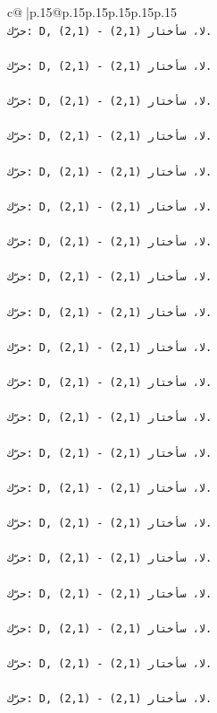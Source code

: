 \documentclass{article}
\begin{document}
{\begin{supertabular}{c@{$\;$}|p{.15\linewidth}@{}p{.15\linewidth}p{.15\linewidth}p{.15\linewidth}p{.15\linewidth}p{.15\linewidth}}
{{{\\ 
\texttt{حرّك: D, (2,1) {-} لا، سأختار (2,1).} \\
\\ 
\texttt{حرّك: D, (2,1) {-} لا، سأختار (2,1).} \\
\\ 
\texttt{حرّك: D, (2,1) {-} لا، سأختار (2,1).} \\
\\ 
\texttt{حرّك: D, (2,1) {-} لا، سأختار (2,1).} \\
\\ 
\texttt{حرّك: D, (2,1) {-} لا، سأختار (2,1).} \\
\\ 
\texttt{حرّك: D, (2,1) {-} لا، سأختار (2,1).} \\
\\ 
\texttt{حرّك: D, (2,1) {-} لا، سأختار (2,1).} \\
\\ 
\texttt{حرّك: D, (2,1) {-} لا، سأختار (2,1).} \\
\\ 
\texttt{حرّك: D, (2,1) {-} لا، سأختار (2,1).} \\
\\ 
\texttt{حرّك: D, (2,1) {-} لا، سأختار (2,1).} \\
\\ 
\texttt{حرّك: D, (2,1) {-} لا، سأختار (2,1).} \\
\\ 
\texttt{حرّك: D, (2,1) {-} لا، سأختار (2,1).} \\
\\ 
\texttt{حرّك: D, (2,1) {-} لا، سأختار (2,1).} \\
\\ 
\texttt{حرّك: D, (2,1) {-} لا، سأختار (2,1).} \\
\\ 
\texttt{حرّك: D, (2,1) {-} لا، سأختار (2,1).} \\
\\ 
\texttt{حرّك: D, (2,1) {-} لا، سأختار (2,1).} \\
\\ 
\texttt{حرّك: D, (2,1) {-} لا، سأختار (2,1).} \\
\\ 
\texttt{حرّك: D, (2,1) {-} لا، سأختار (2,1).} \\
\\ 
\texttt{حرّك: D, (2,1) {-} لا، سأختار (2,1).} \\
\\ 
\texttt{حرّك: D, (2,1) {-} لا، سأختار (2,1).} \\
}}}
\end{supertabular}}
\end{document}
